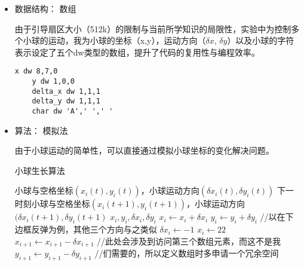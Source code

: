 \documentclass[a4paper,11pt,UTF8]{ctexart}
\begin{document}
	\begin{itemize}
		\item 数据结构： 数组
		
			由于引导扇区大小（512k）的限制与当前所学知识的局限性，实验中为控制多个小球的运动，我为小球的坐标（x,y），运动方向（$\delta x$, $\delta y$）以及小球的字符表示设定了五个dw类型的数组，提升了代码的复用性与编程效率。
			
			
			\clearpage
			\begin{lstlisting}[caption={SStone\_beta.asm数组定义},basicstyle=\footnotesize,tabsize=4,captionpos=b]
	x dw 8,7,0
	y dw 1,0,0
	delta_x dw 1,1,1
	delta_y dw 1,1,1
	char dw 'A',' ',' '
			\end{lstlisting}
			
		\item 算法： 模拟法
		
		由于小球运动的简单性，可以直接通过模拟小球坐标的变化解决问题。
		
		\begin{algorithm}
			\caption{小球生长算法}
			\begin{algorithmic}[1]  %
				\Require 小球与空格坐标$(x_i(t), y_i(t))$，小球运动方向$(\delta x_i(t), \delta y_i(t))$
				\Ensure 下一时刻小球与空格坐标$(x_i(t+1), y_i(t+1))$，小球运动方向$(\delta x_i(t+1), \delta y_i(t+1)$
				 {$x_i, y_i, \delta x_i, \delta y_i$}
				\State  $x_i \gets x_i + \delta x_i$
				\State  $y_i \gets y_i + \delta y_i$		
				 //以在下边框反弹为例，其他三个方向与之类似
				\State $\delta x_i \gets -1$
				\State $x_i \gets 22$
				\State $x_{i+1} \gets x_{i+1} - \delta x_{i+1}$ //此处会涉及到访问第三个数组元素，而这不是我
				\State $y_{i+1} \gets y_{i+1} - \delta y_{i+1}$ //们需要的，所以定义数组时多申请一个冗余空间
				\EndIf 
				\EndFor  

				\EndFunction
			\end{algorithmic}
		\end{algorithm}
		
	\end{itemize}
\end{document}
